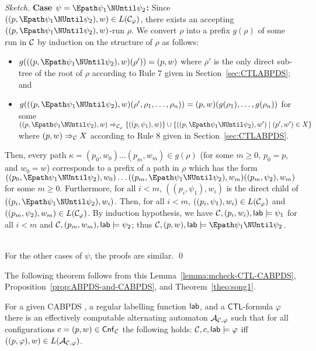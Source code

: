 \documentclass{llncs}
\renewcommand{\CTL}{\ensuremath{\mathsf{CTL}}\xspace}
\newcommand{\inductioncase}[1]{\noindent\textbf{#1}}
\let\phi\varphi
\begin{document}
{{\begin{proof}[Sketch]
\inductioncase{Case $\psi = \Epath\psi_1\NUntil\psi_2$:}
Since $((p,\Epath\psi_1\NUntil\psi_2),w) \in L(\CABPDS_{\phi})$, there exists an accepting $((p,\Epath\psi_1\NUntil\psi_2),w)$-run $\rho$. We convert $\rho$ into a prefix $g(\rho)$ of some run in $\mathcal{C}$
by induction on the structure of $\rho$ as follows:\begin{itemize}
\item $g(((p,\Epath\psi_1\NUntil\psi_2),w)(\rho')) = (p,w)$ where $\rho'$ is the only direct sub-tree of the root of $\rho$ according to Rule 7 given in Section~\ref{sec:CTLABPDS}; and
\item $g(((p,\Epath\psi_1\NUntil\psi_2),w)(\rho',\rho_1,\ldots,\rho_n)) = (p,w)(g(\rho_1),\ldots,g(\rho_n))$
for some $((p,\linebreak\Epath\psi_1\NUntil\psi_2),w)\Rightarrow_{\CABPDS_\varphi} \{((p,\psi_1),w)\} \cup 
\{((p,\Epath\psi_1\NUntil\psi_2),w') \mid (p',w') \in X\}$ where $(p,w)\Rightarrow_\mathcal{C} X$ according to Rule 8 given in Section~\ref{sec:CTLABPDS}.
\end{itemize}
Then, every path $\kappa = (p_0,w_0)\ldots(p_m,w_m) \in g(\rho)$ (for some $m \geq 0$, $p_0 = p$, and $w_0=w$) corresponds to a prefix of a path in $\rho$ 
which has the form
$((p_0,\Epath\psi_1\NUntil\psi_2),w_0)\linebreak\ldots((p_m,\Epath\psi_1\NUntil\psi_2),w_m)((p_m,\psi_2),w_m)$ for some
$m \geq 0$. Furthermore, for all $i < m$, $((p_i,\psi_1),w_i)$ is the direct child of 
$((p_i,\Epath\psi_1\NUntil\psi_2),w_i)$. 
Then, for all $i < m$, $((p_i,\psi_1),\linebreak w_i) \in L(\CABPDS_{\phi})$ and $((p_m,\psi_2),w_m) \in L(\CABPDS_{\phi})$.
By induction hypothesis, we have $\CABPDS,(p_i,w_i\linebreak),\lab \models \psi_1$ for all $i < m$ and
$\mathcal{C},(p_m,w_m),\mathsf{lab} \models \psi_2$; thus
$\CABPDS,(p,w),\lab \models \Epath\psi_1\NUntil \psi_2$.




\noindent \\
For the other cases of $\psi$, the proofs are similar.
\qed

\end{proof}}
The following theorem follows from this Lemma~\ref{lemma:mcheck-CTL-CABPDS}, Proposition~\ref{prop:ABPDS-and-CABPDS}, and  Theorem~\ref{theo:song1}.}
\begin{theorem}\label{theorem:CTL-CABPDS}
For a given CABPDS \CABPDS, a regular labelling function $\mathsf{lab}$, and a \CTL-formula $\varphi$ there is an effectively computable alternating automaton $\mathcal{A}_{\mathcal{C},\varphi}$  such that for all configurations $c=(p,w)\in\mathsf{Cnf}_\mathcal{C}$ the following holds: $\mathcal{C},c,\mathsf{lab}\models\varphi$ iff $((p,\varphi),w)\in L(\mathcal{A}_{\mathcal{C},\varphi})$.

\end{theorem}
\end{document}
